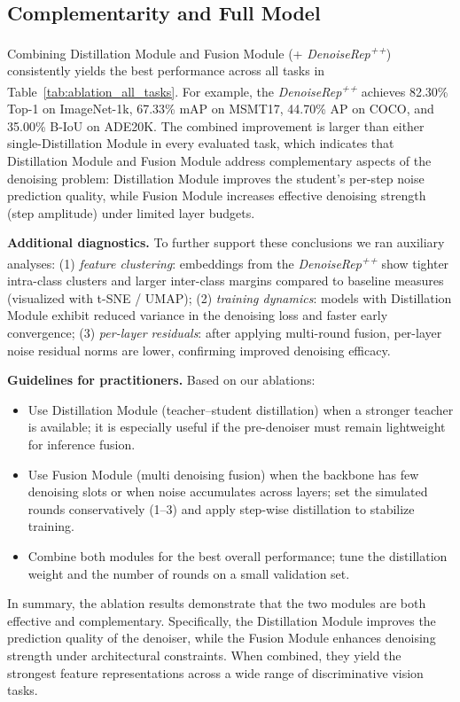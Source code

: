 \documentclass[conference]{IEEEtran}
\begin{document}
{\subsection{Complementarity and Full Model}
Combining Distillation Module and Fusion Module (+ \textit{DenoiseRep\textsuperscript{++}}) consistently yields the best performance across all tasks in Table~\ref{tab:ablation_all_tasks}. For example, the \textit{DenoiseRep\textsuperscript{++}} achieves 82.30\% Top-1 on ImageNet-1k, 67.33\% mAP on MSMT17, 44.70\% AP on COCO, and 35.00\% B-IoU on ADE20K. The combined improvement is larger than either single-Distillation Module in every evaluated task, which indicates that Distillation Module and Fusion Module address complementary aspects of the denoising problem: Distillation Module improves the student’s per-step noise prediction quality, while Fusion Module increases effective denoising strength (step amplitude) under limited layer budgets.

\textbf{Additional diagnostics.} To further support these conclusions we ran auxiliary analyses: (1) \emph{feature clustering}: embeddings from the \textit{DenoiseRep\textsuperscript{++}} show tighter intra-class clusters and larger inter-class margins compared to baseline measures (visualized with t-SNE / UMAP); (2) \emph{training dynamics}: models with Distillation Module exhibit reduced variance in the denoising loss and faster early convergence; (3) \emph{per-layer residuals}: after applying multi-round fusion, per-layer noise residual norms are lower, confirming improved denoising efficacy.

\textbf{Guidelines for practitioners.} Based on our ablations:
\begin{itemize}
  \item Use Distillation Module (teacher--student distillation) when a stronger teacher is available; it is especially useful if the pre-denoiser must remain lightweight for inference fusion.
  \item Use Fusion Module (multi denoising fusion) when the backbone has few denoising slots or when noise accumulates across layers; set the simulated rounds conservatively (1--3) and apply step-wise distillation to stabilize training.
  \item Combine both modules for the best overall performance; tune the distillation weight and the number of rounds on a small validation set.
\end{itemize}

In summary, the ablation results demonstrate that the two modules are both effective and complementary. Specifically, the Distillation Module improves the prediction quality of the denoiser, while the Fusion Module enhances denoising strength under architectural constraints. When combined, they yield the strongest feature representations across a wide range of discriminative vision tasks.


}
\end{document}
